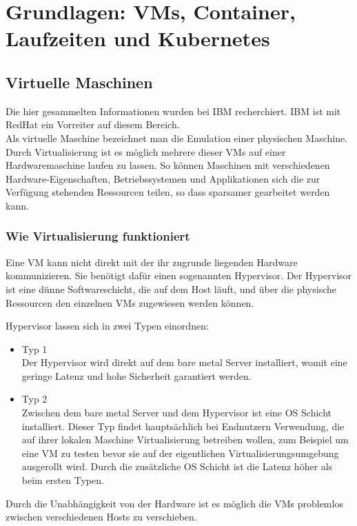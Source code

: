 \chapter[Grundlagen]{Grundlagen: VMs, Container, Laufzeiten und Kubernetes}

\section{Virtuelle Maschinen} 
Die hier gesammelten Informationen wurden bei IBM\cite{vm} recherchiert. IBM ist mit RedHat ein Vorreiter auf diesem Bereich.\\
Als virtuelle Maschine bezeichnet man die Emulation einer physischen Maschine.
Durch Virtualisierung ist es möglich mehrere dieser \ac{VM}s auf einer Hardwaremaschine laufen zu lassen.
So können Maschinen mit verschiedenen Hardware-Eigenschaften, Betriebssystemen und Applikationen sich die zur Verfügung stehenden Ressourcen teilen, so dass sparsamer gearbeitet werden kann.

\subsection{Wie Virtualisierung funktioniert}
Eine \ac{VM} kann nicht direkt mit der ihr zugrunde liegenden Hardware kommunizieren. 
Sie benötigt dafür einen sogenannten Hypervisor.
Der Hypervisor ist eine dünne Softwareschicht, die auf dem Host läuft, und über die physische Ressourcen den einzelnen \ac{VM}s zugewiesen werden können.

Hypervisor lassen sich in zwei Typen einordnen:
\begin{itemize}
    \item Typ 1 \\ 
            Der Hypervisor wird direkt auf dem bare metal Server installiert, womit eine geringe Latenz und hohe Sicherheit garantiert werden.
    \item Typ 2\\
            Zwischen dem bare metal Server und dem Hypervisor ist eine \ac{OS} Schicht installiert. 
            Dieser Typ findet hauptsächlich bei Endnutzern Verwendung, die auf ihrer lokalen Maschine Virtualisierung betreiben wollen, zum Beispiel um eine \ac{VM} zu testen bevor sie auf der eigentlichen Virtualisierungsumgebung ausgerollt wird.
            Durch die zusätzliche \ac{OS} Schicht ist die Latenz höher als beim ersten Typen.
\end{itemize}

Durch die Unabhängigkeit von der Hardware ist es möglich die \ac{VM}s problemlos zwischen verschiedenen Hosts zu verschieben. \\

